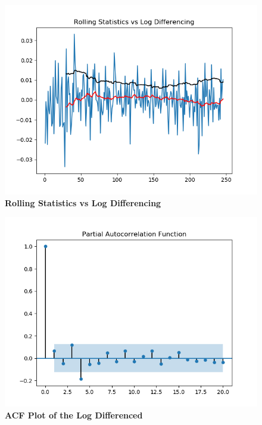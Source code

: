\documentclass[BTech]{srmuthesis}
\begin{document}
\begin{figure}[H]
	\centering
	\includegraphics[width=\linewidth]{ARIMA_RSLogDiff.png}
	\caption{\bf Rolling Statistics vs Log Differencing}
	\label{fig:ARIMA_RSLogDiff}
\end{figure}

\begin{figure}[H]
	\centering
	\includegraphics[width=\linewidth]{ARIMA_ACFLogDiff.png}
	\caption{\bf ACF Plot of the Log Differenced}
	\label{fig:ARIMA_ACFLogDiff}
\end{figure}
\end{document}
